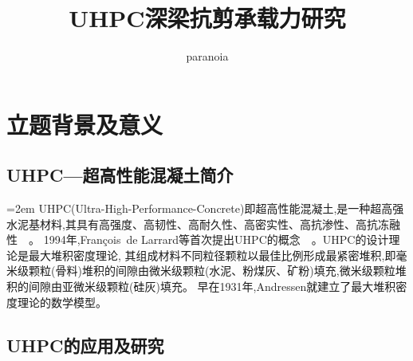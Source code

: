 \documentclass[a4paper,11pt]{article}
\title{UHPC深梁抗剪承载力研究}
\author{paranoia}
\date{}
\begin{document}

\section{立题背景及意义}

\begin{mybox}

\subsection{UHPC---超高性能混凝土简介}
\parindent=2em UHPC(Ultra-High-Performance-Concrete)即超高性能混凝土,是一种超高强水泥基材料,其具有高强度、高韧性、高耐久性、高密实性、高抗渗性、高抗冻融性~~\cite{阎培渝2010超高性能混凝土}。
1994年,Fran{\c{c}}ois\ de Larrard等首次提出UHPC的概念~~\cite{Sedran1994Optimization}。UHPC的设计理论是最大堆积密度理论,
其组成材料不同粒径颗粒以最佳比例形成最紧密堆积,即毫米级颗粒(骨料)堆积的间隙由微米级颗粒(水泥、粉煤灰、矿粉)填充,微米级颗粒堆积的间隙由亚微米级颗粒(硅灰)填充。
早在1931年,Andressen就建立了最大堆积密度理论的数学模型。

\subsection{UHPC的应用及研究}


\end{mybox}
\end{document}
